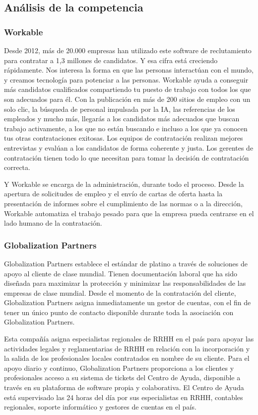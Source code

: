\subsection{Análisis de la competencia}

\subsubsection*{Workable}
Desde 2012, más de 20.000 empresas han utilizado este software de reclutamiento para contratar a 1,3 millones de candidatos. Y esa cifra está creciendo rápidamente. Nos interesa la forma en que las personas interactúan con el mundo, y creamos tecnología para potenciar a las personas. Workable ayuda a conseguir más candidatos cualificados compartiendo tu puesto de trabajo con todos los que son adecuados para él. Con la publicación en más de 200 sitios de empleo con un solo clic, la búsqueda de personal impulsada por la IA, las referencias de los empleados y mucho más, llegarás a los candidatos más adecuados que buscan trabajo activamente, a los que no están buscando e incluso a los que ya conocen tus otras contrataciones exitosas. Los equipos de contratación realizan mejores entrevistas y evalúan a los candidatos de forma coherente y justa. Los gerentes de contratación tienen todo lo que necesitan para tomar la decisión de contratación correcta.

Y Workable se encarga de la administración, durante todo el proceso. Desde la apertura de solicitudes de empleo y el envío de cartas de oferta hasta la presentación de informes sobre el cumplimiento de las normas o a la dirección, Workable automatiza el trabajo pesado para que la empresa pueda centrarse en el lado humano de la contratación.\cite{workable_2012}


\subsubsection*{Globalization Partners}

Globalization Partners establece el estándar de platino a través de soluciones de apoyo al cliente de clase mundial. Tienen documentación laboral que ha sido diseñada para maximizar la protección y minimizar las responsabilidades de las empresas de clase mundial. Desde el momento de la contratación del cliente, Globalization Partners asigna inmediatamente un gestor de cuentas, con el fin de tener un único punto de contacto disponible durante toda la asociación con Globalization Partners.

Esta compañía asigna especialistas regionales de RRHH en el país para apoyar las actividades legales y reglamentarias de RRHH en relación con la incorporación y la salida de los profesionales locales contratados en nombre de su cliente. Para el apoyo diario y continuo, Globalization Partners proporciona a los clientes y profesionales acceso a su sistema de tickets del Centro de Ayuda, disponible a través en su plataforma de software propia y colaborativa. El Centro de Ayuda está supervisado las 24 horas del día por sus especialistas en RRHH, contables regionales, soporte informático y gestores de cuentas en el país. \cite{globalization_partners_2022}